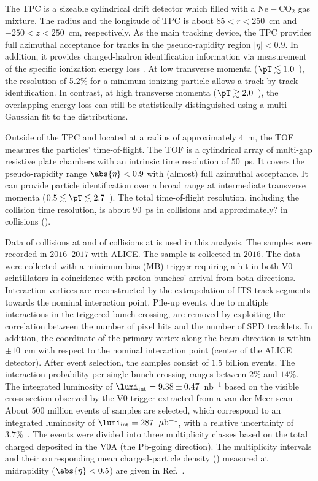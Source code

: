 \documentclass[ALICE,manyauthors]{cernphprep}
\begin{document}
The TPC is a sizeable cylindrical drift detector which filled with a $\mathrm{Ne-CO_{2}}$ gas mixture.
The radius and the longitude of TPC is about $85 < r < 250 $~cm and $-250 < z < 250 $~cm, respectively.
As the main tracking device, the TPC provides full azimuthal acceptance for tracks in the pseudo-rapidity region $|\eta| < 0.9$.
In addition, it provides charged-hadron identification information via measurement of the specific ionization energy loss \dEdx.
At low transverse momenta ($\pT \lesssim 1.0$~\GeVc), the \dEdx resolution of 5.2\% for a minimum ionizing particle allows a track-by-track identification. In contrast, at high transverse momenta ($\pT \gtrsim 2.0$~\GeVc), the overlapping energy loss can still be statistically distinguished using a multi-Gaussian fit to the \dEdx distributions.

Outside of the TPC and located at a radius of approximately $4$~m, the TOF measures the particles' time-of-flight.
The TOF is a cylindrical array of multi-gap resistive plate chambers with an intrinsic time resolution of $50$~ps.
It covers the pseudo-rapidity range $\abs{\eta} < 0.9$ with (almost) full azimuthal acceptance.
It can provide particle identification over a broad range at intermediate transverse momenta ($0.5 \lesssim \pT \lesssim 2.7$~\GeVc).
The total time-of-flight resolution, including the collision time resolution, is about $90$~ps in \pp collisions and approximately? in \pPb collisions ().

Data of \pp collisions at \thirteen and of \pPb collisions at \fivenn is used in this analysis.
The \pp samples were recorded in $2016$--$2017$ with ALICE.
The \pPb sample is collected in $2016$.
The data were collected with a minimum bias (MB) trigger requiring a hit in both V0 scintillators in coincidence with proton bunches' arrival from both directions.
Interaction vertices are reconstructed by the extrapolation of ITS track segments towards the nominal interaction point.
Pile-up events, due to multiple interactions in the triggered bunch crossing, are removed by exploiting the correlation between the number of pixel hits and the number of SPD tracklets.
In addition, the coordinate of the primary vertex along the beam direction is within $\pm 10$~cm with respect to the nominal interaction point (center of the ALICE detector).
After event selection, the \pp samples consist of $1.5$ billion events.
The interaction probability per single bunch crossing ranges between $2\%$ and $14\%$.
The integrated luminosity of $\lumi_{\rm int} = 9.38\pm 0.47$~nb$^{-1}$ based on the visible cross section observed by the V0 trigger extracted from a van der Meer scan~\cite{ALICE-PUBLIC-2016-002}.
About $500$ million events of \pPb samples are selected, which correspond to an integrated luminosity of $\lumi_{\rm int} = 287$~$\mu{\rm b}^{-1}$, with a relative uncertainty of $3.7\%$~\cite{collaboration_2014}.
The \pPb events were divided into three multiplicity classes based on the total charged deposited in the V0A (the Pb-going direction).
The multiplicity intervals and their corresponding mean charged-particle density (\dndeta) measured at midrapidity ($\abs{\eta} < 0.5$) are given in Ref.~\cite{Adam:2015pza}. 
\end{document}

